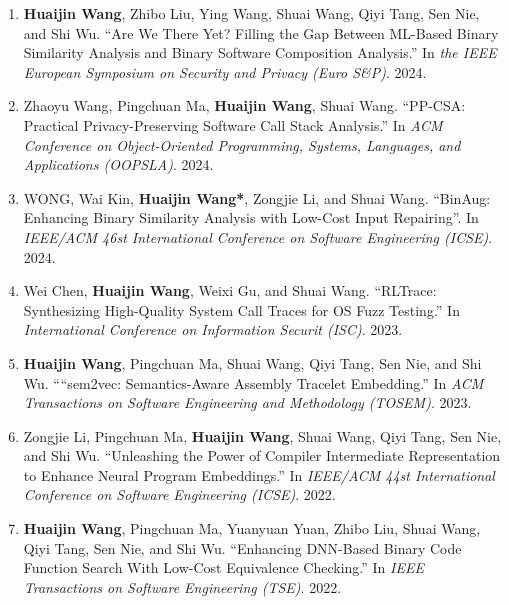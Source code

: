 \begin{enumerate}
    \item \textbf{Huaijin Wang}, Zhibo Liu, Ying Wang, Shuai Wang, Qiyi Tang, Sen Nie, and Shi Wu.
    ``Are We There Yet? Filling the Gap Between ML-Based Binary Similarity Analysis and Binary Software Composition Analysis.''
    In \textit{the IEEE European Symposium on Security and Privacy (Euro S\&P)}. 2024.
    
    \item Zhaoyu Wang, Pingchuan Ma, \textbf{Huaijin Wang}, Shuai Wang.
    ``PP-CSA: Practical Privacy-Preserving Software Call Stack Analysis.''
    In \textit{ACM Conference on Object-Oriented Programming, Systems, Languages, and Applications (OOPSLA)}. 2024.
    
    \item WONG, Wai Kin, \textbf{Huaijin Wang*}, Zongjie Li, and Shuai Wang.
    ``BinAug: Enhancing Binary Similarity Analysis with Low-Cost Input Repairing''.
    In \textit{IEEE/ACM 46st International Conference on Software Engineering (ICSE)}. 2024.
    
    \item Wei Chen, \textbf{Huaijin Wang}, Weixi Gu, and Shuai Wang.
    ``RLTrace: Synthesizing High-Quality System Call Traces for OS Fuzz Testing.''
    In \textit{International Conference on Information Securit (ISC)}. 2023.

    \item \textbf{Huaijin Wang}, Pingchuan Ma, Shuai Wang, Qiyi Tang, Sen Nie, and Shi Wu.
    ``“sem2vec: Semantics-Aware Assembly Tracelet Embedding.''
    In \textit{ACM Transactions on Software Engineering and Methodology (TOSEM)}. 2023.
    
    \item Zongjie Li, Pingchuan Ma, \textbf{Huaijin Wang}, Shuai Wang, Qiyi Tang, Sen Nie, and Shi Wu.
    ``Unleashing the Power of Compiler
    Intermediate Representation to Enhance Neural Program Embeddings.''
    In \textit{IEEE/ACM 44st International Conference on Software Engineering (ICSE)}. 2022.
    
    \item \textbf{Huaijin Wang}, Pingchuan Ma, Yuanyuan Yuan, Zhibo Liu, Shuai Wang, Qiyi Tang, Sen Nie, and Shi Wu.
    ``Enhancing DNN-Based
    Binary Code Function Search With Low-Cost Equivalence Checking.''
    In \textit{IEEE Transactions on Software Engineering (TSE)}. 2022.
    
    

\end{enumerate}
